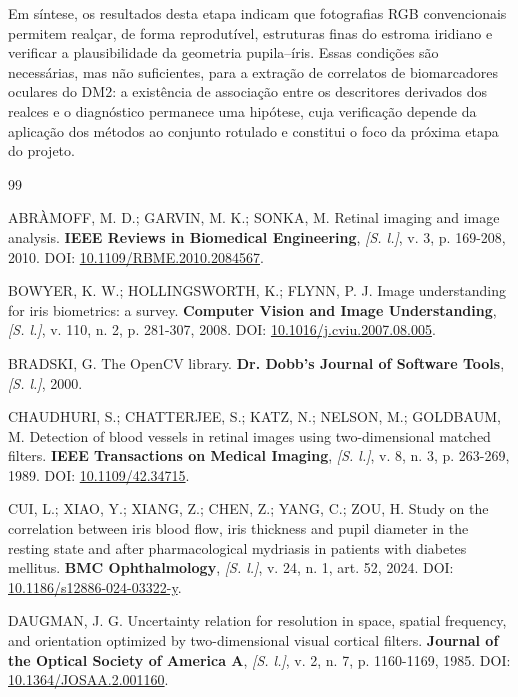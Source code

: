\documentclass[12pt, oneside, a4paper, chapter=TITLE, section=TITLE,
               english, brazil]{abntex2}
\newcommand{\doi}[1]{DOI: \href{https://doi.org/#1}{#1}}
\newcommand{\semlocal}{\textit{[S. l.]}}
\begin{document}
Em síntese, os resultados desta etapa indicam que fotografias RGB
convencionais permitem realçar, de forma reprodutível, estruturas finas do
estroma iridiano e verificar a plausibilidade da geometria pupila--íris.
Essas condições são necessárias, mas não suficientes, para a extração de
correlatos de biomarcadores oculares do DM2: a existência de associação entre
os descritores derivados dos realces e o diagnóstico permanece uma hipótese,
cuja verificação depende da aplicação dos métodos ao conjunto rotulado e
constitui o foco da próxima etapa do projeto.

\postextual

\begin{thebibliography}{99}

ABRÀMOFF, M. D.; GARVIN, M. K.; SONKA, M. Retinal imaging and image analysis.
\textbf{IEEE Reviews in Biomedical Engineering}, \semlocal, v. 3, p. 169-208,
2010. \doi{10.1109/RBME.2010.2084567}.

BOWYER, K. W.; HOLLINGSWORTH, K.; FLYNN, P. J. Image understanding for iris
biometrics: a survey. \textbf{Computer Vision and Image Understanding},
\semlocal, v. 110, n. 2, p. 281-307, 2008. \doi{10.1016/j.cviu.2007.08.005}.

BRADSKI, G. The OpenCV library. \textbf{Dr. Dobb's Journal of Software
Tools}, \semlocal, 2000.

CHAUDHURI, S.; CHATTERJEE, S.; KATZ, N.; NELSON, M.; GOLDBAUM, M. Detection
of blood vessels in retinal images using two-dimensional matched filters.
\textbf{IEEE Transactions on Medical Imaging}, \semlocal, v. 8, n. 3,
p. 263-269, 1989. \doi{10.1109/42.34715}.

CUI, L.; XIAO, Y.; XIANG, Z.; CHEN, Z.; YANG, C.; ZOU, H. Study on the
correlation between iris blood flow, iris thickness and pupil diameter in the
resting state and after pharmacological mydriasis in patients with diabetes
mellitus. \textbf{BMC Ophthalmology}, \semlocal, v. 24, n. 1, art. 52, 2024.
\doi{10.1186/s12886-024-03322-y}.

DAUGMAN, J. G. Uncertainty relation for resolution in space, spatial
frequency, and orientation optimized by two-dimensional visual cortical
filters. \textbf{Journal of the Optical Society of America A}, \semlocal,
v. 2, n. 7, p. 1160-1169, 1985. \doi{10.1364/JOSAA.2.001160}.


\end{thebibliography}
\end{document}
